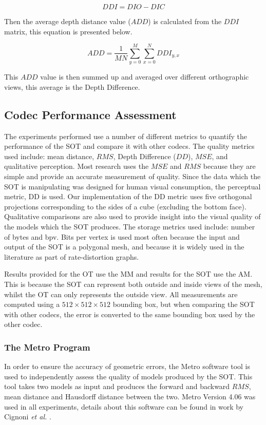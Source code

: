 $$
DDI = DIO - DIC
$$

Then the average depth distance value ($ADD$) is calculated from the $DDI$ matrix, this equation is presented below.

$$
ADD = \frac{1}{MN} \sum_{y=0}^{M} \sum_{x=0}^{N} DDI_{y,x}
$$

This $ADD$ value is then summed up and averaged over different orthographic views, this average is the Depth Difference.

\subsection{Codec Performance Assessment}

The experiments performed use a number of different metrics to quantify the performance of the SOT and compare it with other codecs. The quality metrics used include: mean distance, $RMS$, Depth Difference ($DD$), $MSE$, and qualitative perception. Most research uses the $MSE$ and $RMS$ because they are simple and provide an accurate measurement of quality. Since the data which the SOT is manipulating was designed for human visual consumption, the perceptual metric, DD is used. Our implementation of the DD metric uses five orthogonal projections corresponding to the sides of a cube (excluding the bottom face). Qualitative comparisons are also used to provide insight into the visual quality of the models which the SOT produces. The storage metrics used include: number of bytes and bpv. Bits per vertex is used most often because the input and output of the SOT is a polygonal mesh, and because it is widely used in the literature as part of rate-distortion graphs.

Results provided for the OT use the MM and results for the SOT use the AM. This is because the SOT can represent both outside and inside views of the mesh, whilst the OT can only represents the outside view. All measurements are computed using a $512 \times 512 \times 512$ bounding box, but when comparing the SOT with other codecs, the error is converted to the same bounding box used by the other codec.

\subsubsection{The Metro Program}

In order to ensure the accuracy of geometric errors, the Metro software tool is used to independently assess the quality of models produced by the SOT. This tool takes two models as input and produces the forward and backward $RMS$, mean distance and Hausdorff distance between the two. Metro Version 4.06 was used in all experiments, details about this software can be found in work by Cignoni \textit{et al.} \cite{Cignoni98Metro}.

